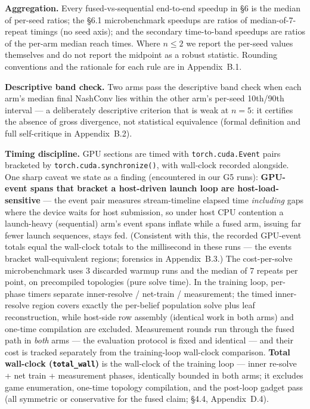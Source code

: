 \documentclass[11pt]{article}
\begin{document}
\textbf{Aggregation.} Every fused-vs-sequential end-to-end speedup in \S6 is the median
of per-seed ratios; the \S6.1 microbenchmark speedups are ratios of median-of-7-repeat
timings (no seed axis); and the secondary time-to-band speedups are ratios of the
per-arm median reach times. Where $n \le 2$ we report the per-seed values themselves and
do not report the midpoint as a robust statistic. Rounding conventions and the rationale
for each rule are in Appendix~B.1.

\textbf{Descriptive band check.} Two arms pass the descriptive band check when each arm's
median final NashConv lies within the other arm's per-seed 10th/90th interval --- a
deliberately descriptive criterion that is weak at $n{=}5$: it certifies the absence of
gross divergence, not statistical equivalence (formal definition and full self-critique
in Appendix~B.2).

\textbf{Timing discipline.} GPU sections are timed with \texttt{torch.cuda.Event} pairs
bracketed by \texttt{torch.cuda.synchronize()}, with wall-clock recorded alongside. One
sharp caveat we state as a finding (encountered in our G5 runs): \textbf{GPU-event spans
that bracket a host-driven launch loop are host-load-sensitive} --- the event pair
measures stream-timeline elapsed time \emph{including} gaps where the device waits for
host submission, so under host CPU contention a launch-heavy (sequential) arm's event
spans inflate while a fused arm, issuing far fewer launch sequences, stays fed.
(Consistent with this, the recorded GPU-event totals equal the wall-clock totals to the
millisecond in these runs --- the events bracket wall-equivalent regions; forensics in
Appendix~B.3.) The cost-per-solve microbenchmark uses 3 discarded warmup runs and the
median of 7 repeats per point, on precompiled topologies (pure solve time). In the
training loop, per-phase timers separate inner-resolve / net-train / measurement; the
timed inner-resolve region covers exactly the per-belief population solve plus leaf
reconstruction, while host-side row assembly (identical work in both arms) and one-time
compilation are excluded. Measurement rounds run through the fused path in \emph{both}
arms --- the evaluation protocol is fixed and identical --- and their cost is tracked
separately from the training-loop wall-clock comparison. \textbf{Total wall-clock
(\texttt{total\_wall})} is the wall-clock of the training loop --- inner re-solve + net
train + measurement phases, identically bounded in both arms; it excludes game
enumeration, one-time topology compilation, and the post-loop gadget pass (all symmetric
or conservative for the fused claim; \S4.4, Appendix~D.4).
\end{document}
